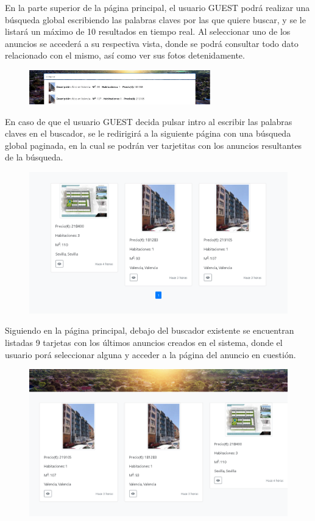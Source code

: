 En la parte superior de la p\'{a}gina principal, el usuario GUEST podr\'{a} realizar una b\'{u}squeda global escribiendo las palabras claves por las que quiere buscar, y se le listar\'{a} un m\'{a}ximo de 10 resultados en tiempo real. Al seleccionar uno de los anuncios se acceder\'{a} a su respectiva vista, donde se podr\'{a} consultar todo dato relacionado con el mismo, as\'{i} como ver sus fotos detenidamente.

\begin{figure}[h!]
\centering
\includegraphics[width=0.7\textwidth]{Img/ManualUsuario/GLOBAL_SEARCH_GUEST.jpg}
\end{figure}


En caso de que el usuario GUEST decida pulsar intro al escribir las palabras claves en el buscador, se le redirigir\'{a} a la siguiente p\'{a}gina con una b\'{u}squeda global paginada, en la cual se podr\'{a}n ver tarjetitas con los anuncios resultantes de la b\'{u}squeda.

\begin{figure}[h!]
\centering
\includegraphics[width=.7\textwidth]{Img/ManualUsuario/GLOBAL_SEARCH_ENTER.png}
\end{figure}

Siguiendo en la p\'{a}gina principal, debajo del buscador existente se encuentran listadas 9 tarjetas con los \'{u}ltimos anuncios creados en el sistema, donde el usuario por\'{a} seleccionar alguna y acceder a la p\'{a}gina del anuncio en cuesti\'{o}n.


\begin{figure}[h!]
\centering
\includegraphics[width=.5\textwidth]{Img/ManualUsuario/TARJETAS.png}
\end{figure}


